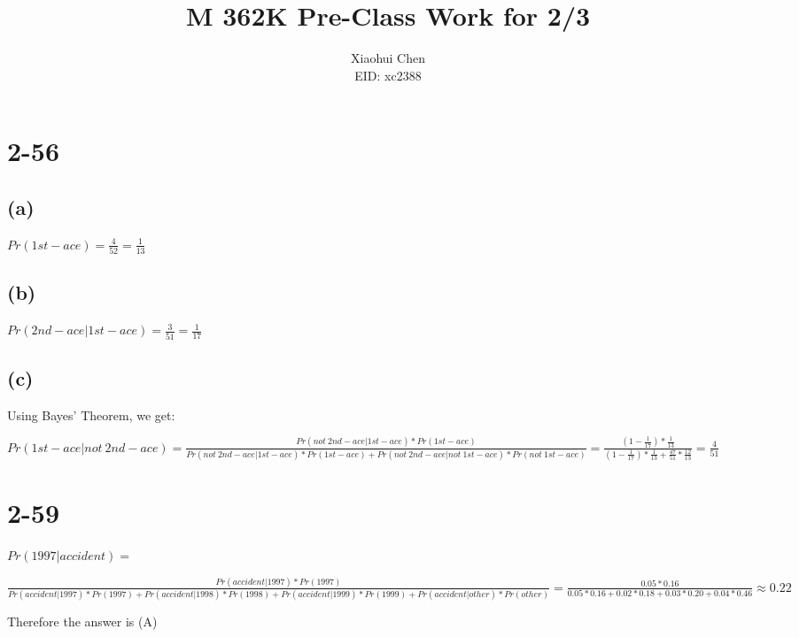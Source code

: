 \documentclass[12pt]{article}
\author{Xiaohui Chen \\EID: xc2388}
\title{M 362K Pre-Class Work for 2/3}
\begin{document}
\maketitle
\begin{spacing}{2.0}

\section*{2-56}
\subsection*{(a)}
$Pr(1st-ace)=\frac{4}{52}=\frac{1}{13}$

\subsection*{(b)}
$Pr(2nd-ace|1st-ace)=\frac{3}{51}=\frac{1}{17}$

\subsection*{(c)}
Using Bayes' Theorem, we get: 

$Pr(1st-ace|not\ 2nd-ace)=\frac{Pr(not\ 2nd-ace|1st-ace) * Pr(1st-ace)}{Pr(not\ 2nd-ace|1st-ace) * Pr(1st-ace) + Pr(not\ 2nd-ace|not\ 1st-ace) * Pr(not\ 1st-ace)} = \frac{(1-\frac{1}{17})*\frac{1}{13}}{(1-\frac{1}{17})*\frac{1}{13}+ \frac{47}{51}*\frac{12}{13}}= \frac{4}{51}$

\section*{2-59}
$Pr(1997|accident)=$

$\frac{Pr(accident|1997)*Pr(1997)}{ Pr(accident|1997)*Pr(1997)+ Pr(accident|1998)*Pr(1998)+ Pr(accident|1999)*Pr(1999)+ Pr(accident|other)*Pr(other)}= \frac{0.05*0.16}{0.05*0.16+ 0.02*0.18+ 0.03*0.20+ 0.04*0.46} \approx 0.22$

Therefore the answer is (A)

\end{spacing}
\end{document}

